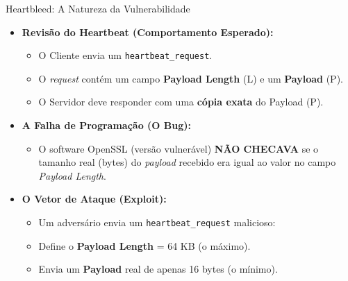 \begin{frame}{Heartbleed: A Natureza da Vulnerabilidade}
    \begin{itemize}
        \item \textbf{Revisão do Heartbeat (Comportamento Esperado):}
              \begin{itemize}
                  \item O Cliente envia um \texttt{heartbeat\_request}.
                  \item O \textit{request} contém um campo \textbf{Payload Length} (L) e um \textbf{Payload} (P).
                  \item O Servidor deve responder com uma \textbf{cópia exata} do Payload (P).
              \end{itemize}

        \item \textbf{A Falha de Programação (O Bug):}
              \begin{itemize}
                  \item O software OpenSSL (versão vulnerável) \textbf{NÃO CHECAVA} se o tamanho real (bytes) do \textit{payload} recebido era igual ao valor no campo \textit{Payload Length}.
              \end{itemize}

        \item \textbf{O Vetor de Ataque (Exploit):}
              \begin{itemize}
                  \item Um adversário envia um \texttt{heartbeat\_request} malicioso:
                  \item Define o \textbf{Payload Length} = 64 KB (o máximo).
                  \item Envia um \textbf{Payload} real de apenas 16 bytes (o mínimo).
              \end{itemize}
    \end{itemize}
\end{frame}

